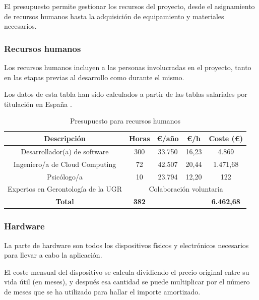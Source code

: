El presupuesto permite gestionar los recursos del proyecto, desde el asignamiento de recursos humanos hasta la adquisición de equipamiento y materiales necesarios.

\subsubsection{Recursos humanos}
Los recursos humanos incluyen a las personas involucradas en el proyecto, tanto en las etapas previas al desarrollo como durante el mismo. 

Los datos de esta tabla han sido calculados a partir de las tablas salariales por titulación en España \parencite{glassdoor2024}.  

\begin{table}[H]
    \centering
    \begin{tabular}{|c|c|c|c|c|}
    \hline
    \rowcolor{lightgray}
    \textbf{Descripción} & \textbf{Horas} & \textbf{€/año} & \textbf{€/h} & \textbf{Coste (€)} \\
    \hline
    Desarrollador(a) de software & 300 & 33.750 & 16,23 & 4.869 \\
    \hline
    Ingeniero/a de Cloud Computing & 72 & 42.507 & 20,44 & 1.471,68 \\
    \hline
    Psicólogo/a & 10 & 23.794 & 12,20 & 122 \\
    \hline
    Expertos en Gerontología de la UGR & \multicolumn{4}{|c|}{Colaboración voluntaria} \\
    \hline
    \textbf{Total} & \textbf{382} & \multicolumn{2}{|c|}{} & \textbf{6.462,68} \\
    \hline
    \end{tabular}
    \caption{Presupuesto para recursos humanos}
    \label{tab:presupuesto-personal}
\end{table}

\subsubsection{Hardware}
La parte de hardware son todos los dispositivos físicos y electrónicos necesarios para llevar a cabo la aplicación.

El coste mensual del dispositivo se calcula dividiendo el precio original entre su vida útil (en meses), y después esa cantidad se puede multiplicar por el número de meses que se ha utilizado para hallar el importe amortizado.

